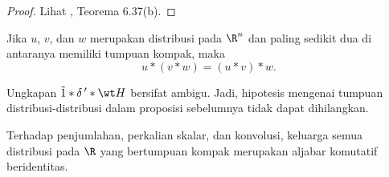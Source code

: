 \begin{proof} Lihat \cite{Rudin:1991}, Teorema 6.37(b).  \ns
\end{proof}

\begin{prop}\label{prop_assoc_convol_distr} Jika $u$, $v$, dan $w$ merupakan distribusi pada $\R^n$ dan paling sedikit dua di antaranya memiliki
tumpuan kompak, maka
    \[ u \ast (v \ast w) = (u \ast v) \ast w. \]
\end{prop}

\begin{exam} Ungkapan $\tilde 1 \ast \delta\,' \ast \wt H$ bersifat ambigu. Jadi, hipotesis mengenai tumpuan
distribusi-distribusi dalam proposisi sebelumnya tidak dapat dihilangkan.
\end{exam}

\begin{prop} Terhadap penjumlahan, perkalian skalar, dan konvolusi, keluarga semua distribusi pada $\R$ yang bertumpuan kompak
merupakan aljabar komutatif beridentitas.
\end{prop}













